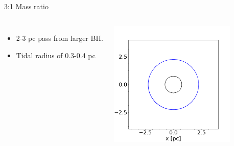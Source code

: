 \documentclass[aspectratio=169]{beamer}
\begin{document}
\subsection{}
\begin{frame}
  {3:1 Mass ratio}
  \begin{columns}
    \begin{itemize}
      \item 2-3 pc pass from larger BH.
      \item Tidal radius of 0.3-0.4 pc
    \end{itemize}
    \includegraphics[width=6cm, height=6cm]{./Images/hvgc1_0333ratio.png}
    \centering
  \end{columns}
\end{frame}

\backupend
\end{document}
